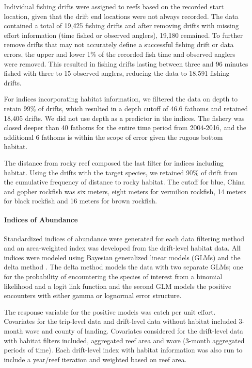 \documentclass[
  authoryear,
  preprint,
  3p]{elsarticle}
\let\oldparagraph\paragraph
\renewcommand{\paragraph}[1]{\oldparagraph{#1}\mbox{}}
\begin{document}
Individual fishing drifts were assigned to reefs based on the recorded
start location, given that the drift end locations were not always
recorded. The data contained a total of 19,425 fishing drifts and after
removing drifts with missing effort information (time fished or observed
anglers), 19,180 remained. To further remove drifts that may not
accurately define a successful fishing drift or data errors, the upper
and lower 1\% of the recorded fish time and observed anglers were
removed. This resulted in fishing drifts lasting between three and 96
minutes fished with three to 15 observed anglers, reducing the data to
18,591 fishing drifts.

For indices incorporating habitat information, we filtered the data on
depth to retain 99\% of drifts, which resulted in a depth cutoff of 46.6
fathoms and retained 18,405 drifts. We did not use depth as a predictor
in the indices. The fishery was closed deeper than 40 fathoms for the
entire time period from 2004-2016, and the additional 6 fathoms is
within the scope of error given the rugous bottom habitat.

The distance from rocky reef composed the last filter for indices
including habitat. Using the drifts with the target species, we retained
90\% of drift from the cumulative frequency of distance to rocky
habitat. The cutoff for blue, China and gopher rockfish was six meters,
eight meters for vermilion rockfish, 14 meters for black rockfish and 16
meters for brown rockfish.

\hypertarget{indices-of-abundance}{%
\paragraph{Indices of Abundance}\label{indices-of-abundance}}

Standardized indices of abundance were generated for each data filtering
method and an area-weighted index was developed from the drift-level
habitat data. All indices were modeled using Bayesian generalized linear
models (GLMs) and the delta method \citep{Lo:1992:IRA}. The delta method
models the data with two separate GLMs; one for the probability of
encountering the species of interest from a binomial likelihood and a
logit link function and the second GLM models the positive encounters
with either gamma or lognormal error structure.

The response variable for the positive models was catch per unit effort.
Covariates for the trip-level data and drift-level data without habitat
included 3-month wave and county of landing. Covariates considered for
the drift-level data with habitat filters included, aggregated reef area
and wave (3-month aggregated periods of time). Each drift-level index
with habitat information was also run to include a year/reef iteration
and weighted based on reef area.
\end{document}
